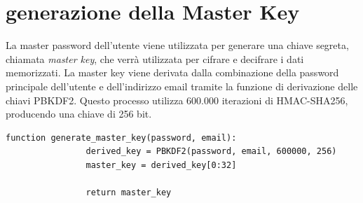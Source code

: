 \documentclass[a4paper,12pt]{report}
\begin{document}
		\section{generazione della Master Key}
		
		La master password dell'utente viene utilizzata per generare una chiave
		segreta, chiamata \textit{master key}, che verrà utilizzata per cifrare
		e decifrare i dati memorizzati. La master key viene derivata dalla
		combinazione della password principale dell'utente e dell'indirizzo
		email tramite la funzione di derivazione delle chiavi PBKDF2. Questo
		processo utilizza 600.000 iterazioni di HMAC-SHA256, producendo una
		chiave di 256 bit.\\
		\begin{lstlisting}[style=pseudocode]
			function generate_master_key(password, email):
				derived_key = PBKDF2(password, email, 600000, 256)
				master_key = derived_key[0:32]
				
				return master_key
		\end{lstlisting}
\end{document}

